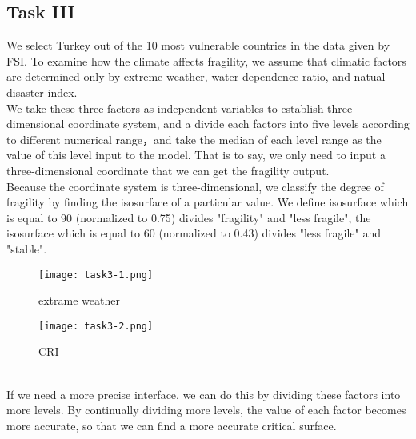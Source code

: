 \documentclass{mcmthesis}
\begin{document}
\subsection{Task III}
We select Turkey out of the 10 most vulnerable countries in the data given by FSI. To examine how the climate affects fragility, we assume that climatic factors are determined only by extreme weather, water dependence ratio, and natual disaster index.\\
We take these three factors as independent variables to establish three-dimensional coordinate system, and a divide each factors into five levels according to different numerical range，and take the median of each level range as the value of this level input to the model. That is to say, we only need to input a three-dimensional coordinate that we can get the fragility output.\\
Because the coordinate system is three-dimensional, we classify the degree of fragility by finding the isosurface of a particular value. We define isosurface which is equal to 90 (normalized to 0.75) divides  "fragility" and "less fragile", the isosurface which is equal to 60 (normalized to 0.43) divides "less fragile" and "stable".
\begin{figure}[h]
  \begin{minipage}[h]{0.48\textwidth}
  \flushleft
  \texttt{[image: task3-1.png]}
  \caption{extrame weather}
  \end{minipage}
  \begin{minipage}[h]{0.48\textwidth}
  \flushright
  \texttt{[image: task3-2.png]}
  \caption{CRI}
  \end{minipage}
\end{figure} \\
\newpage
If we need a more precise interface, we can do this by dividing these factors into more levels. By continually dividing more levels, the value of each factor becomes more accurate, so that we can find a more accurate critical surface.
\end{document}
